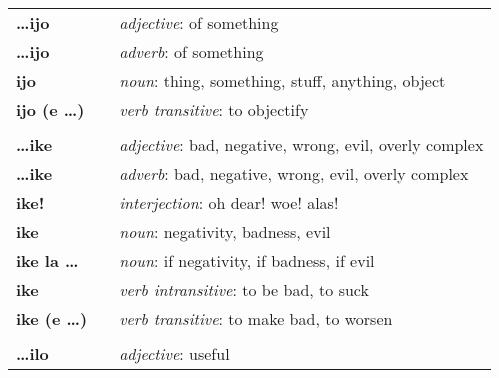 \begin{supertabular}{p{2,5cm}|ll}
    \textbf{\dots ijo}           &  & \textit{adjective}: of something                                                                           \\
    \textbf{\dots ijo}           &  & \textit{adverb}: of something                                                                              \\
    \textbf{ijo}                 &  & \textit{noun}: thing, something, stuff, anything, object                                                   \\
    \textbf{ijo (e \dots)}       &  & \textit{verb transitive}: to objectify                                                                     \\
                                 &  &                                                                                                            \\
    \textbf{\dots ike}           &  & \textit{adjective}: bad, negative, wrong, evil, overly complex                                             \\
    \textbf{\dots ike}           &  & \textit{adverb}: bad, negative, wrong, evil, overly complex                                                \\
    \textbf{ike!}                &  & \textit{interjection}: oh dear! woe! alas!                                                                 \\
    \textbf{ike}                 &  & \textit{noun}: negativity, badness, evil                                                                   \\
    \textbf{ike la \dots}        &  & \textit{noun}: if negativity, if badness, if evil                                                          \\
    \textbf{ike}                 &  & \textit{verb intransitive}: to be bad, to suck                                                             \\
    \textbf{ike (e \dots)}       &  & \textit{verb transitive}: to make bad, to worsen                                                           \\
                                 &  &                                                                                                            \\
    \textbf{\dots ilo}           &  & \textit{adjective}: useful                                                                                 \\

\end{supertabular}
